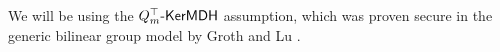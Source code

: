We will be using the $Q_m^\top\mbox{-}\mathsf{KerMDH}$ assumption, which was proven secure in the generic bilinear group model by Groth and Lu \cite{AC:GroLu07}.

%
%
%
%
%
